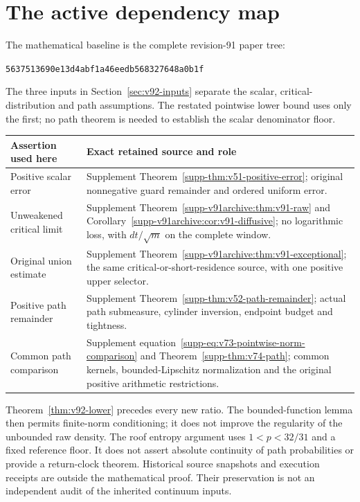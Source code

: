 \section{The active dependency map}
\label{app:v92-dependencies}
The mathematical baseline is the complete revision-91 paper tree:
\begin{center}\small
\texttt{5637513690e13d4abf1a46eedb568327648a0b1f}
\end{center}
The three inputs in Section~\ref{sec:v92-inputs} separate the scalar,
critical-distribution and path assumptions. The restated pointwise lower
bound uses only the first; no path theorem is needed to establish the
scalar denominator floor.

\begin{center}
\small
\begin{tabular}{p{}p{}}
\hline
Assertion used here & Exact retained source and role\\
\hline
Positive scalar error & Supplement Theorem~\ref{supp-thm:v51-positive-error};
original nonnegative guard remainder and ordered uniform error.\\[3pt]
Unweakened critical limit & Supplement Theorem~\ref{supp-v91archive:thm:v91-raw}
and Corollary~\ref{supp-v91archive:cor:v91-diffusive}; no logarithmic loss,
with $dt/\sqrt m$ on the complete window.\\[3pt]
Original union estimate & Supplement Theorem~\ref{supp-v91archive:thm:v91-exceptional};
the same critical-or-short-residence source, with one positive upper selector.\\[3pt]
Positive path remainder & Supplement Theorem~\ref{supp-thm:v52-path-remainder};
actual path submeasure, cylinder inversion, endpoint budget and tightness.\\[3pt]
Common path comparison & Supplement equation~\eqref{supp-eq:v73-pointwise-norm-comparison}
and Theorem~\ref{supp-thm:v74-path}; common kernels, bounded-Lipschitz
normalization and the original positive arithmetic restrictions.\\
\hline
\end{tabular}
\end{center}

Theorem~\ref{thm:v92-lower} precedes every new ratio. The bounded-function
lemma then permits finite-norm conditioning; it does not improve the
regularity of the unbounded raw density. The roof entropy argument uses
$1<p<32/31$ and a fixed reference floor. It does not assert absolute
continuity of path probabilities or provide a return-clock theorem.
Historical source snapshots and execution receipts are outside the
mathematical proof. Their preservation is not an independent audit of
the inherited continuum inputs.
